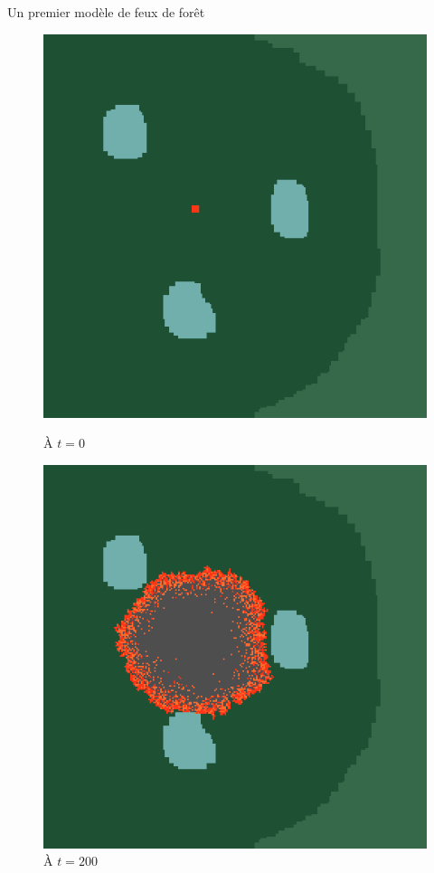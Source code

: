 \documentclass{beamer}
\begin{document}
\begin{frame}{Un premier modèle de feux de forêt \hyperlink{jump}{\beamerbutton{ }} \hypertarget{5}{\beamerbutton{ }}}
    \begin{figure}[!htb]
        \begin{minipage}{0.48\textwidth}
          \centering
          \includegraphics[width=.8\linewidth]{pictures/model1/land_before.png}
          \caption{À $t=0$}\label{Fig:Data1}
        \end{minipage}\hfill
        \begin{minipage}{0.48\textwidth}
          \centering
          \includegraphics[width=.8\linewidth]{pictures/model1/land_200.png}
          \caption{À $t=200$}\label{Fig:Data2}
        \end{minipage}
     \end{figure}
\end{frame}
\end{document}
